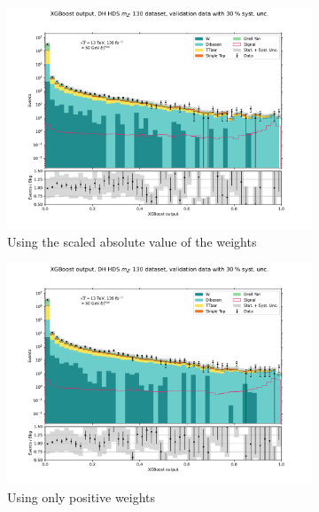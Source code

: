 \documentclass[14pt, a4paper]{book}
\begin{document}
\graphicspath{{../../../Plots/XGBoost/WEIGHT_TEST/DH_HDS_mZp_130/}}
\begin{figure}[!ht]
	\centering
	\begin{subfigure}[b]{0.49\textwidth}
      \centering
      \includegraphics[width=1\textwidth]{ATLAS_ABS/VAL.pdf}
      \caption{Using the scaled absolute value of the weights}
   \end{subfigure}
   \begin{subfigure}[b]{0.49\textwidth}
      \centering
      \includegraphics[width=1\textwidth]{POS/VAL.pdf}
      \caption{Using only positive weights}
   \end{subfigure}
   \begin{subfigure}[b]{0.49\textwidth}
      \centering

\end{subfigure}
\end{figure}
\end{document}
